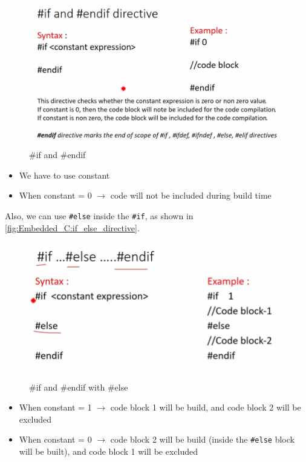 \begin{figure}[h]
\centering
\includegraphics[scale=0.55]{Figures/Embedded_C/if_directive}
\caption{\#if and \#endif}
\label{fig:Embedded_C:if_directive}
\end{figure}

\begin{itemize}
    \item We have to use constant

    \item When constant = 0 $\rightarrow$ code will not be included during build time
\end{itemize}


\newpage
Also, we can use \verb|#else| inside the \verb|#if|, as shown in \autoref{fig:Embedded_C:if_else_directive}.


\begin{figure}[h]
\centering
\includegraphics[scale=0.55]{Figures/Embedded_C/if_else_directive}
\caption{\#if and \#endif with \#else}
\label{fig:Embedded_C:if_else_directive}
\end{figure}

\begin{itemize}
    \item When constant = 1 $\rightarrow$ code block 1 will be build, and code block 2 will be excluded

    \item When constant = 0 $\rightarrow$ code block 2 will be build (inside the \verb|#else| block will be built), and code block 1 will be excluded

    
\end{itemize}

